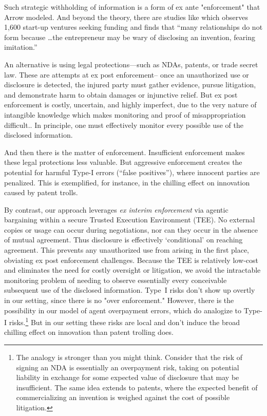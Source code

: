 \documentclass{article}
\begin{document}
Such strategic withholding of information is a form of ex ante "enforcement" that Arrow modeled. And beyond the theory, there are studies like \citet{dushnitsky2009limitations} which observes 1{,}600 start-up ventures seeking funding and finds that “many relationships do not form because \dots the entrepreneur may be wary of disclosing an invention, fearing imitation.” 

An alternative is using legal protections—such as NDAs, patents, or trade secret law. These are attempts at ex post enforcement-- once an unauthorized use or disclosure is detected, the injured party must gather evidence, pursue litigation, and demonstrate harm to obtain damages or injunctive relief. But ex post enforcement is costly, uncertain, and highly imperfect, due to the very nature of intangible knowledge which makes monitoring and proof of misappropriation difficult.\citep{Graham2005, MorganLewis2015, contigiani2019trade}. In principle,
one must effectively monitor every possible use of the disclosed information. 

And then there is the matter of enforcement. Insufficient enforcement makes these legal protections less valuable. But aggressive enforcement creates the potential for harmful Type-I errors (“false positives”), where innocent parties are penalized. This is exemplified, for instance, in the chilling effect on innovation caused by patent trolls.\citep{cohen2019patent}

By contrast, our approach leverages \emph{ex interim enforcement} via agentic bargaining within a secure Trusted Execution Environment (TEE). No external copies or usage can occur during negotiations, nor can they occur in the absence of mutual agreement. Thus disclosure is effectively ‘conditional’ on reaching agreement. This prevents any unauthorized use from arising in the first place, obviating ex post enforcement challenges. Because the TEE is relatively low‐cost and eliminates the need for costly oversight or litigation, we avoid the intractable monitoring problem of needing to observe essentially every conceivable subsequent use of the disclosed information. Type~I risks don't show up overtly in our setting, since there is no "over enforcement." However, there is the possibility in our model of agent overpayment errors, which do analogize to Type-I risks.\footnote{The analogy is stronger than you might think. Consider that the risk of signing an NDA is essentially an overpayment risk, taking on potential liability in exchange for some expected value of disclosure that may be insufficient. The same idea extends to patents, where the expected benefit of commercializing an invention is weighed against the cost of possible litigation.} But in our setting these risks are local and don't induce the broad chilling effect on innovation than patent trolling does.
\end{document}
